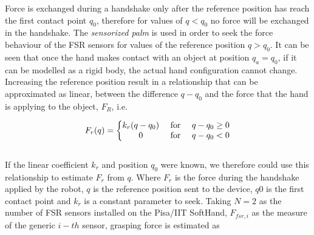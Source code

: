 Force is exchanged during a handshake only after the reference position has reach the first contact point $q_0$, therefore for values of $q < q_0$ no force will be exchanged in the handshake. %
The \textit{sensorized palm} is used in order to seek the force behaviour of the FSR sensors for values of the reference position $q > q_0$. 
It can be seen that once the hand makes contact with an object at position $q_a = q_0$, if it can be modelled as a rigid body, the actual hand configuration cannot change. Increasing the reference position result in a relationship
that can be approximated as linear, between the difference $q-q_0$ and the force that the hand is applying to the object, $F_R$, i.e. 

\begin{equation}
F_{r}(q)=\left\{\begin{matrix}
k_{r}(q-q_0) & $ for $ &q-q_0 \geq 0 \\ 
0 & $ for $ & q-q_0 < 0
\end{matrix}\right.
\label{eq:genericForce}
\end{equation}\\

%
If the linear coefficient $k_{r}$ and position $q_0$ were known, we therefore could use this relationship to estimate $F_{r}$ from $q$.  
Where $F_r$ is the force during the handshake applied by the robot, $q$ is the reference position sent to the device, $q0$ is the first contact point and $k_{r}$ is a constant parameter to seek.
Taking $N=2$ as the number of FSR sensors installed on the Pisa/IIT SoftHand, $F_{fsr,i}$ as the measure of the generic $i-th$ sensor, grasping force is estimated as %

